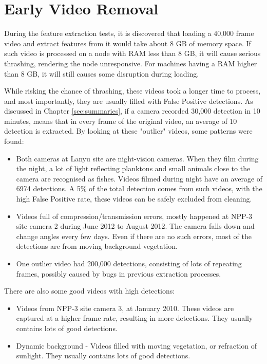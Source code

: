 \documentclass[bsc,logo,twoside,fullspacing,parskip]{infthesis}
\begin{document}
\section{Early Video Removal}

During the feature extraction tests, it is discovered that loading a 40,000 frame video and extract features from it would take about 8 GB of memory space. 
If such video is processed on a node with RAM less than 8 GB, it will cause serious thrashing, rendering the node unresponsive. For machines having a RAM higher than 8 GB, it will still causes some disruption during loading.  

While risking the chance of thrashing, these videos took a longer time to process, and most importantly, they are usually filled with False Positive detections. As discussed in Chapter \ref{sec:summaries}, if a camera recorded 30,000 detection in 10 minutes, means that in every frame of the original video, an average of 10 detection is extracted. By looking at these "outlier" videos, some patterns were found:

\begin{itemize}
\item
Both cameras at Lanyu site are night-vision cameras. When they film during the night, a lot of light reflecting planktons and small animals close to the camera are recognised as fishes. Videos filmed during night have an average of 6974 detections. A 5\% of the total detection comes from such videos, with the high False Positive rate, these videos can be safely excluded from cleaning.
\item
Videos full of compression/transmission errors, mostly happened at NPP-3 site camera 2 during June 2012 to August 2012. The camera falls down and change angles every few days. Even if there are no such errors, most of the detections are from moving background vegetation.
\item
One outlier video had 200,000 detections, consisting of lots of repeating frames, possibly caused by bugs in previous extraction processes.
\end{itemize}
There are also some good videos with high detections: 
\begin{itemize}
\item
Videos from NPP-3 site camera 3, at January 2010. These videos are captured at a higher frame rate, resulting in more detections. They usually contains lots of good detections.
\item
Dynamic background - Videos filled with moving vegetation, or refraction of sunlight. They usually contains lots of good detections.
\end{itemize}
\end{document}
